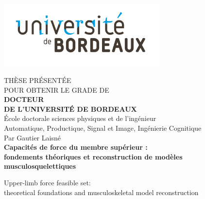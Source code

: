 
\begin{titlepage}

    \centering\includegraphics[scale=1, height=3.4cm]{img/page_de_garde/Universite Bordeaux RVB-01.png}
    \hfill
    
    \begin{center}
    
    \doublespacing
    
    THÈSE PRÉSENTÉE\\ POUR OBTENIR LE GRADE DE \\
    {\LARGE \textbf{DOCTEUR\\DE L'UNIVERSITÉ DE BORDEAUX} } \\
    \vspace{0.55cm}
    École doctorale sciences physiques et de l'ingénieur\\
    {\normalsize Automatique, Productique, Signal et Image, Ingénierie Cognitique} \\
    \vspace{0.55cm}
    Par {\large Gautier Laisné} \\
    \vspace{0.55cm}
    {\Large \textbf{Capacités de force du membre supérieur :\\\large fondements théoriques et reconstruction de modèles musculosquelettiques}}
    
    \begin{singlespace}
        \small Upper-limb force feasible set:\\theoretical foundations and musculoskeletal model reconstruction
    \end{singlespace}


\end{center}
\end{titlepage}
